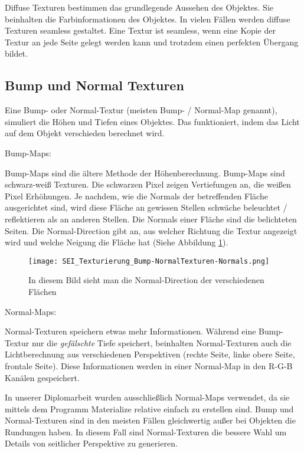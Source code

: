 Diffuse Texturen\citep{blender:tex_introduction} bestimmen das grundlegende Aussehen des Objektes. Sie beinhalten die Farbinformationen des
Objektes.
In vielen Fällen werden diffuse Texturen seamless gestaltet. Eine Textur ist seamless, wenn eine Kopie der Textur an
jede Seite gelegt werden kann und trotzdem einen perfekten Übergang bildet.

\subsection{Bump und Normal Texturen}
\label{sec:tex_normal}

Eine Bump- oder Normal-Textur (meisten Bump- / Normal-Map genannt), simuliert die Höhen und Tiefen eines Objektes.
Das funktioniert, indem das Licht auf dem Objekt verschieden berechnet wird.\citep{unity:normal_vs_bump}


Bump-Maps:

Bump-Maps sind die ältere Methode der Höhenberechnung. Bump-Maps sind schwarz-weiß Texturen. Die schwarzen Pixel
zeigen Vertiefungen an, die weißen Pixel Erhöhungen. Je nachdem, wie die Normals der betreffenden Fläche ausgerichtet
sind, wird diese Fläche an gewissen Stellen schwäche beleuchtet / reflektieren als an anderen Stellen. Die Normals
einer Fläche sind die belichteten Seiten. Die Normal-Direction gibt an, aus welcher Richtung die Textur angezeigt
wird und welche Neigung die Fläche hat (Siehe Abbildung \ref{picture:normals}).

\begin{figure}[H]
    \centering
    \texttt{[image: SEI\_Texturierung\_Bump-NormalTexturen-Normals.png]}
    \caption{In diesem Bild sieht man die Normal-Direction der verschiedenen Flächen}
    \label{picture:normals}
\end{figure}


Normal-Maps:

Normal-Texturen speichern etwas mehr Informationen. Während eine Bump-Textur nur die \textit{gefälschte} Tiefe
speichert, beinhalten Normal-Texturen auch die Lichtberechnung aus verschiedenen Perspektiven (rechte Seite,
linke obere Seite, frontale Seite). Diese Informationen werden in einer Normal-Map in den R-G-B Kanälen gespeichert.

In unserer Diplomarbeit wurden ausschließlich Normal-Maps verwendet, da sie mittels dem Programm
Materialize\citep{bbs:materialize} relative einfach zu erstellen sind. Bump und Normal-Texturen sind in den meisten
Fällen gleichwertig außer bei Objekten die Rundungen haben. In diesem Fall sind Normal-Texturen die bessere Wahl
um Details von seitlicher Perspektive zu generieren.

